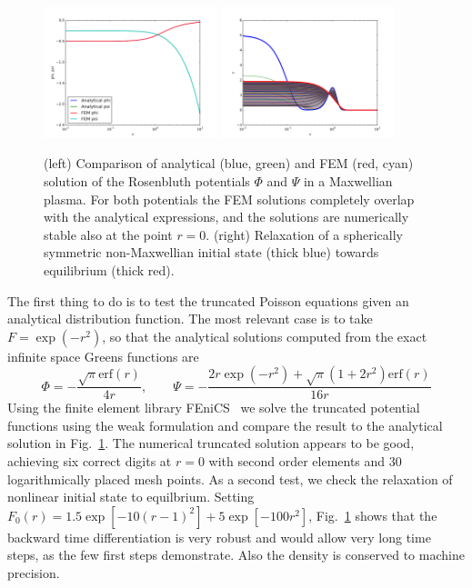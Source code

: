 \documentclass[preprint]{revtex4}
\newcommand{\erf}{\textrm{erf}}
\begin{document}
\begin{figure}[!h]
\includegraphics[width=0.45\textwidth]{fig/phi_psi.png}
\includegraphics[width=0.45\textwidth]{fig/f_relaxation.png}
\caption{(left) Comparison of analytical (blue, green) and FEM (red, cyan) solution of the Rosenbluth potentials $\Phi$ and $\Psi$ in a Maxwellian plasma. For both potentials the FEM solutions completely overlap with the analytical expressions, and the solutions are numerically stable also at the point $r=0$. (right) Relaxation of a spherically symmetric non-Maxwellian initial state (thick blue) towards equilibrium (thick red).}
\label{fig:spherical_test}
\end{figure}
The first thing to do is to test the truncated Poisson equations given an analytical distribution function. The most relevant case is to take $F=\exp(-r^2)$, so that the analytical solutions computed from the exact infinite space Greens functions are
\begin{equation}
\Phi=-\frac{\sqrt{\pi}\erf(r)}{4r},\qquad
\Psi=-\frac{2r\exp(-r^2)+\sqrt{\pi}(1+2r^2)\erf(r)}{16r}
\end{equation}
Using the finite element library \rm{FEniCS}~\cite{dolfin_ref} we solve the truncated potential functions using the weak formulation and compare the result to the analytical solution in Fig.~\ref{fig:spherical_test}. The numerical truncated solution appears to be good, achieving six correct digits at $r=0$ with second order elements and 30 logarithmically placed mesh points. As a second test, we check the relaxation of nonlinear initial state to equilbrium. Setting $F_0(r)=1.5\exp\left[-10(r-1)^2\right]+5\exp\left[-100r^2\right]$, Fig.~\ref{fig:spherical_test} shows that the backward time differentiation is very robust and would allow very long time steps, as the few first steps demonstrate. Also the density is conserved to machine precision.
\end{document}
